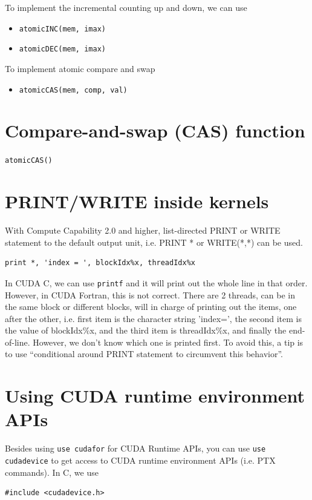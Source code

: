 To implement the incremental counting up and down, we can use
\begin{itemize}
\item \verb.atomicINC(mem, imax).
\item \verb.atomicDEC(mem, imax).
\end{itemize}

To implement atomic compare and swap
\begin{itemize}
\item \verb.atomicCAS(mem, comp, val).
\end{itemize}

\section{Compare-and-swap (CAS) function}
\label{sec:compare-swap-cas}

\verb!atomicCAS()!

\section{PRINT/WRITE inside kernels}
\label{sec:printwr-inside-kern}

With Compute Capability 2.0 and higher, list-directed PRINT or WRITE
statement to the default output unit, i.e. PRINT * or WRITE(*,*) can
be used.
\begin{lstlisting}
print *, 'index = ', blockIdx%x, threadIdx%x
\end{lstlisting}

In CUDA C, we can use \verb!printf! and it will print out the whole
line in that order. However, in CUDA Fortran, this is not
correct. There are 2 threads, can be in the same block or different
blocks, will in charge of printing out the items, one after the other,
i.e. first item is the character string 'index=', the second item is
the value of blockIdx\%x, and the third item is threadIdx\%x, and
finally the end-of-line. However, we don't know which one is printed
first. To avoid this, a tip is to use ``conditional around PRINT
statement to circumvent this behavior''. 

\section{Using CUDA runtime environment APIs}
\label{sec:using-cuda-runtime}

Besides using \verb!use cudafor! for CUDA Runtime APIs, you can use
\verb!use cudadevice! to get access to CUDA runtime environment APIs
(i.e. PTX commands). In C, we use
\begin{lstlisting}
#include <cudadevice.h>
\end{lstlisting}


